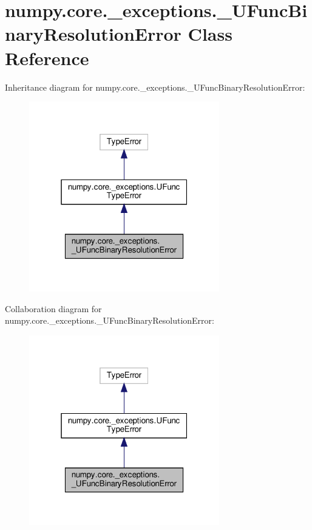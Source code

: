 \hypertarget{classnumpy_1_1core_1_1__exceptions_1_1__UFuncBinaryResolutionError}{}\section{numpy.\+core.\+\_\+exceptions.\+\_\+\+U\+Func\+Binary\+Resolution\+Error Class Reference}
\label{classnumpy_1_1core_1_1__exceptions_1_1__UFuncBinaryResolutionError}


Inheritance diagram for numpy.\+core.\+\_\+exceptions.\+\_\+\+U\+Func\+Binary\+Resolution\+Error\+:
\nopagebreak
\begin{figure}[H]
\begin{center}
\leavevmode
\includegraphics[width=235pt]{classnumpy_1_1core_1_1__exceptions_1_1__UFuncBinaryResolutionError__inherit__graph}
\end{center}
\end{figure}


Collaboration diagram for numpy.\+core.\+\_\+exceptions.\+\_\+\+U\+Func\+Binary\+Resolution\+Error\+:
\nopagebreak
\begin{figure}[H]
\begin{center}
\leavevmode
\includegraphics[width=235pt]{classnumpy_1_1core_1_1__exceptions_1_1__UFuncBinaryResolutionError__coll__graph}
\end{center}
\end{figure}
